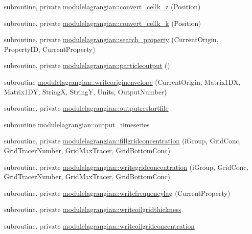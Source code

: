 \begin{DoxyCompactItemize}
\item 
subroutine, private \mbox{\hyperlink{namespacemodulelagrangian_a57a623f0deb9516670279b9b6aad02a1}{modulelagrangian\+::convert\+\_\+cellk\+\_\+z}} (Position)
\item 
subroutine, private \mbox{\hyperlink{namespacemodulelagrangian_ab49d9104b72e09c3e511a3c37180d96b}{modulelagrangian\+::convert\+\_\+cellk\+\_\+k}} (Position)
\item 
subroutine, private \mbox{\hyperlink{namespacemodulelagrangian_a507e0e8500a409a6449e91da89ba4420}{modulelagrangian\+::search\+\_\+property}} (Current\+Origin, Property\+ID, Current\+Property)
\item 
subroutine, private \mbox{\hyperlink{namespacemodulelagrangian_aa775be66f039a949bf0d897457b63cab}{modulelagrangian\+::particleoutput}} ()
\item 
subroutine \mbox{\hyperlink{namespacemodulelagrangian_ad8e85e4295614bd67b14e48cf963619a}{modulelagrangian\+::writeoriginenvelope}} (Current\+Origin, Matrix1\+DX, Matrix1\+DY, StringX, StringY, Units, Output\+Number)
\item 
subroutine, private \mbox{\hyperlink{namespacemodulelagrangian_aeabb1bf3ca49fb9ff017aaf38a5ad02b}{modulelagrangian\+::outputrestartfile}}
\item 
subroutine \mbox{\hyperlink{namespacemodulelagrangian_a0fa6098d248ced3df6bda0b337789166}{modulelagrangian\+::output\+\_\+timeseries}}
\item 
subroutine, private \mbox{\hyperlink{namespacemodulelagrangian_a841c52a7705b666c34f7c0874d5c88d6}{modulelagrangian\+::fillgridconcentration}} (i\+Group, Grid\+Conc, Grid\+Tracer\+Number, Grid\+Max\+Tracer, Grid\+Bottom\+Conc)
\item 
subroutine, private \mbox{\hyperlink{namespacemodulelagrangian_ae773f710fefd7f114888e5227ec75766}{modulelagrangian\+::writegridconcentration}} (i\+Group, Grid\+Conc, Grid\+Tracer\+Number, Grid\+Max\+Tracer, Grid\+Bottom\+Conc)
\item 
subroutine, private \mbox{\hyperlink{namespacemodulelagrangian_a73f212ed028e8e36231a715754b12d20}{modulelagrangian\+::writefrequencylag}} (Current\+Property)
\item 
subroutine, private \mbox{\hyperlink{namespacemodulelagrangian_a8e2a2d0598e7ab5be827b9dd3693d75d}{modulelagrangian\+::writeoilgridthickness}}
\item 
subroutine, private \mbox{\hyperlink{namespacemodulelagrangian_a8b7319e82910c93802b83b6f1391023e}{modulelagrangian\+::writeoilgridconcentration}}
\item 

\end{DoxyCompactItemize}
